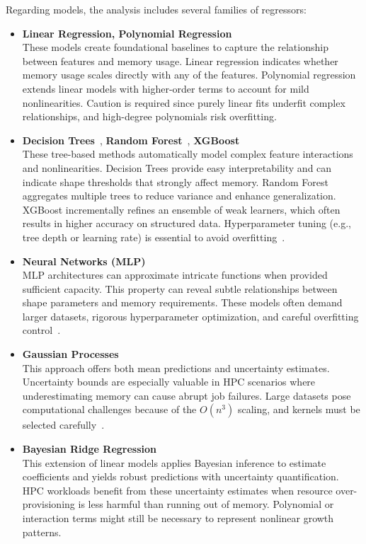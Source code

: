 Regarding models, the analysis includes several families of regressors:

\begin{itemize}
    \item \textbf{Linear Regression, Polynomial Regression}~\cite{hastie2009elements}\\
    These models create foundational baselines to capture the relationship between features and memory usage.
    Linear regression indicates whether memory usage scales directly with any of the features.
    Polynomial regression extends linear models with higher-order terms to account for mild nonlinearities.
    Caution is required since purely linear fits underfit complex relationships, and high-degree polynomials risk overfitting.

    \item \textbf{Decision Trees}~\cite{breiman1984classification}, \textbf{Random Forest}~\cite{breiman2001random}, \textbf{\ac{XGBoost}}~\cite{chen2016xgboost}\\
    These tree-based methods automatically model complex feature interactions and nonlinearities.
    Decision Trees provide easy interpretability and can indicate shape thresholds that strongly affect memory.
    Random Forest aggregates multiple trees to reduce variance and enhance generalization.
    \ac{XGBoost} incrementally refines an ensemble of weak learners, which often results in higher accuracy on structured data.
    Hyperparameter tuning (e.g., tree depth or learning rate) is essential to avoid overfitting~\cite{bergstra2012}.

    \item \textbf{Neural Networks (\ac{MLP})}~\cite{rumelhart1986learning}\\
    \ac{MLP} architectures can approximate intricate functions when provided sufficient capacity.
    This property can reveal subtle relationships between shape parameters and memory requirements.
    These models often demand larger datasets, rigorous hyperparameter optimization, and careful overfitting control~\cite{lecun2015deep}.

    \item \textbf{Gaussian Processes}~\cite{rasmussen2006gaussian}\\
    This approach offers both mean predictions and uncertainty estimates.
    Uncertainty bounds are especially valuable in \ac{HPC} scenarios where underestimating memory can cause abrupt job failures.
    Large datasets pose computational challenges because of the \(O(n^3)\) scaling, and kernels must be selected carefully~\cite{quinonero2005}.

    \item \textbf{Bayesian Ridge Regression}~\cite{bishop2006pattern}\\
    This extension of linear models applies Bayesian inference to estimate coefficients and yields robust predictions with uncertainty quantification.
    HPC workloads benefit from these uncertainty estimates when resource over-provisioning is less harmful than running out of memory.
    Polynomial or interaction terms might still be necessary to represent nonlinear growth patterns.
\end{itemize}

